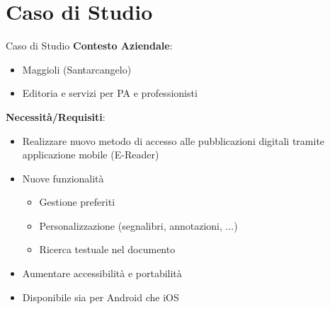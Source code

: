 
\section{Caso di Studio}

\begin{frame}{Caso di Studio}
    \textbf{Contesto Aziendale}:
    \begin{itemize}
        \item Maggioli (Santarcangelo)
        \item Editoria e servizi per PA e professionisti
    \end{itemize}

    \vspace{3mm}

    \textbf{Necessità/Requisiti}:
    \begin{itemize}
        \item Realizzare nuovo metodo di accesso alle pubblicazioni digitali tramite applicazione mobile (E-Reader)
        \item Nuove funzionalità
        \begin{itemize}
            \item Gestione preferiti
            \item Personalizzazione (segnalibri, annotazioni, ...)
            \item Ricerca testuale nel documento
        \end{itemize}
        \item Aumentare accessibilità e portabilità
        \item Disponibile sia per Android che iOS
    \end{itemize}   
\end{frame}